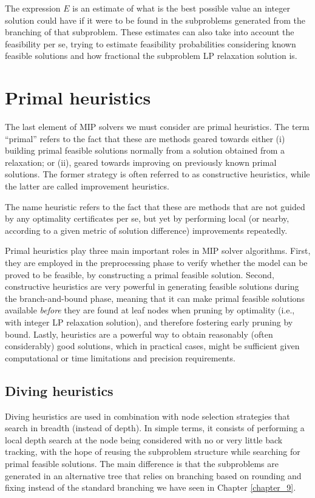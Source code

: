 The expression $E$ is an estimate of what is the best possible value an integer solution could have if it were to be found in the subproblems generated from the branching of that subproblem. These estimates can also take into account the feasibility per se, trying to estimate feasibility probabilities considering known feasible solutions and how fractional the subproblem LP relaxation solution is. 



\section{Primal heuristics}
 
The last element of MIP solvers we must consider are primal heuristics. The term ``primal'' refers to the fact that these are methods geared towards either (i) building primal feasible solutions normally from a solution obtained from a relaxation; or (ii), geared towards improving on previously known primal solutions. The former strategy is often referred to as constructive heuristics, while the latter are called improvement heuristics. 

The name heuristic refers to the fact that these are methods that are not guided by any optimality certificates per se, but yet by performing local (or nearby, according to a given metric of solution difference) improvements repeatedly.

Primal heuristics play three main important roles in MIP solver algorithms. First, they are employed in the preprocessing phase to verify whether the model can be proved to be feasible, by constructing a primal feasible solution. Second, constructive heuristics are very powerful in generating feasible solutions during the branch-and-bound phase, meaning that it can make primal feasible solutions available \emph{before} they are found at leaf nodes when pruning by optimality (i.e., with integer LP relaxation solution), and therefore fostering early pruning by bound. Lastly, heuristics are a powerful way to obtain reasonably (often considerably) good solutions, which in practical cases, might be sufficient given computational or time limitations and precision requirements.


\subsection{Diving heuristics}

Diving heuristics are used in combination with node selection strategies that search in breadth (instead of depth). In simple terms, it consists of performing a local depth search at the node being considered with no or very little back tracking, with the hope of reusing the subproblem structure while searching for primal feasible solutions. The main difference is that the subproblems are generated in an alternative tree that relies on branching based on rounding and fixing instead of the standard branching we have seen in Chapter \ref{chapter_9}. 

